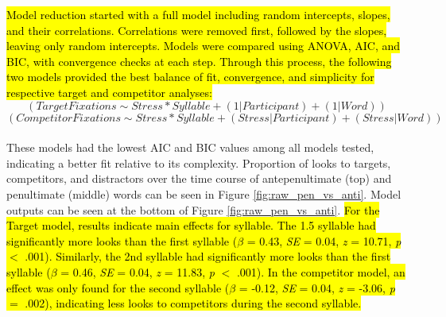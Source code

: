 \hl{Model reduction started with a full model including random intercepts, slopes, and their correlations. Correlations were removed first, followed by the slopes, leaving only random intercepts. Models were compared using ANOVA, AIC, and BIC, with convergence checks at each step. Through this process, the following two models provided the best balance of fit, convergence, and simplicity for respective target and competitor analyses:} $$(Target  Fixations \sim Stress * Syllable + (1|Participant)+(1|Word))$$
$$(Competitor  Fixations \sim Stress * Syllable + (Stress|Participant)+(Stress|Word))$$\\
These models had the lowest AIC and BIC values among all models tested, indicating a better fit relative to its complexity. Proportion of looks to targets, competitors, and distractors over the time course of antepenultimate (top) and  penultimate (middle) words can be seen in Figure \ref{fig:raw_pen_vs_anti}. Model outputs can be seen at the bottom of Figure \ref{fig:raw_pen_vs_anti}. \hl{For the Target model, results indicate main effects for syllable. The  1.5 syllable had significantly more looks than the first syllable ($\beta$ = 0.43, \textit{SE} = 0.04, \textit{z} = 10.71, \textit{p} $<$ .001). Similarly, the 2nd syllable had significantly more looks than the first syllable ($\beta$ = 0.46, \textit{SE} = 0.04, \textit{z} = 11.83, \textit{p} $<$ .001). In the competitor model, an effect was only found for the second syllable ($\beta$ = -0.12, \textit{SE} = 0.04, \textit{z} = -3.06, \textit{p} $=$ .002), indicating less looks to competitors during the second syllable.}

